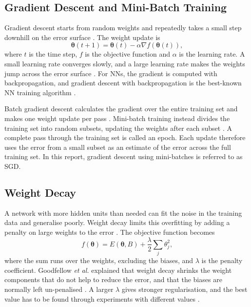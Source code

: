 \documentclass[conference]{IEEEtran}
\begin{document}
\subsection{Gradient Descent and Mini-Batch Training}
Gradient descent starts from random weights and repeatedly takes a
small step downhill on the error surface
\cite{kelleher2015}. The weight update is
\begin{equation}
\boldsymbol{\theta}(t+1) = \boldsymbol{\theta}(t)
- \alpha \nabla f(\boldsymbol{\theta}(t)),
\end{equation}
where $t$ is the time step, $f$ is the objective function and $\alpha$
is the learning rate. A small learning rate converges slowly, and a
large learning rate makes the weights jump across the error surface
\cite{kelleher2015}. For NNs, the gradient is computed
with backpropagation, and gradient descent with backpropagation is the
best-known NN training algorithm \cite{dennis2021}.

Batch gradient descent calculates the gradient over the entire training set 
and makes one weight update per pass \cite{kelleher2015}. Mini-batch 
training instead divides the training set into random subsets, updating the 
weights after each subset \cite{dennis2021}. A complete pass through the 
training set is called an epoch. Each update therefore uses the error from 
a small subset as an estimate of the error across the full training set. In 
this report, gradient descent using mini-batches is referred to as SGD.

\subsection{Weight Decay}
A network with more hidden units than needed can fit the noise in the
training data and generalise poorly. Weight decay limits this
overfitting by adding a penalty on large weights to the error
\cite{goodfellow2016}. The objective function becomes
\begin{equation}
f(\boldsymbol{\theta}) = E(\boldsymbol{\theta}, B)
+ \frac{\lambda}{2} \sum_{j} \theta_j^2,
\label{eq:obj}
\end{equation}
where the sum runs over the weights, excluding the biases, and
$\lambda$ is the penalty coefficient. Goodfellow \textit{et al.}
explained that weight decay shrinks the weight components that do not
help to reduce the error, and that the biases are normally left
un-penalised \cite{goodfellow2016}. A larger $\lambda$ gives stronger
regularisation, and the best value has to be found through
experiments with different values \cite{goodfellow2016}.
\end{document}
